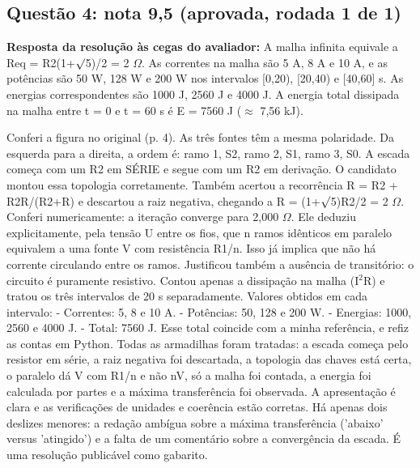 \documentclass{article}%
\begin{document}
\subsection*{Questão 4: nota 9,5 (aprovada, rodada 1 de 1)}%
\textbf{Resposta da resolução às cegas do avaliador:} A malha infinita equivale a Req = R2(1+$\surd$5)/2 = 2 $\Omega$. As correntes na malha são 5 A, 8 A e 10 A, e as potências são 50 W, 128 W e 200 W nos intervalos {[}0,20), {[}20,40) e {[}40,60{]} s. As energias correspondentes são 1000 J, 2560 J e 4000 J. A energia total dissipada na malha entre t = 0 e t = 60 s é E = 7560 J ($\approx$ 7,56 kJ).\par %
Conferi a figura no original (p. 4). As três fontes têm a mesma polaridade. Da esquerda para a direita, a ordem é: ramo 1, S2, ramo 2, S1, ramo 3, S0. A escada começa com um R2 em SÉRIE e segue com um R2 em derivação. O candidato montou essa topologia corretamente. Também acertou a recorrência R = R2 + R2R/(R2+R) e descartou a raiz negativa, chegando a R = (1+$\surd$5)R2/2 = 2 $\Omega$. Conferi numericamente: a iteração converge para 2,000 $\Omega$.\newline%
\newline%
Ele deduziu explicitamente, pela tensão U entre os fios, que n ramos idênticos em paralelo equivalem a uma fonte V com resistência R1/n. Isso já implica que não há corrente circulando entre os ramos. Justificou também a ausência de transitório: o circuito é puramente resistivo. Contou apenas a dissipação na malha (I$^2$R) e tratou os três intervalos de 20 s separadamente.\newline%
\newline%
Valores obtidos em cada intervalo:\newline%
{-} Correntes: 5, 8 e 10 A.\newline%
{-} Potências: 50, 128 e 200 W.\newline%
{-} Energias: 1000, 2560 e 4000 J.\newline%
{-} Total: 7560 J.\newline%
\newline%
Esse total coincide com a minha referência, e refiz as contas em Python. Todas as armadilhas foram tratadas: a escada começa pelo resistor em série, a raiz negativa foi descartada, a topologia das chaves está certa, o paralelo dá V com R1/n e não nV, só a malha foi contada, a energia foi calculada por partes e a máxima transferência foi observada. A apresentação é clara e as verificações de unidades e coerência estão corretas. Há apenas dois deslizes menores: a redação ambígua sobre a máxima transferência ('abaixo' versus 'atingido') e a falta de um comentário sobre a convergência da escada. É uma resolução publicável como gabarito.%
\end{document}
